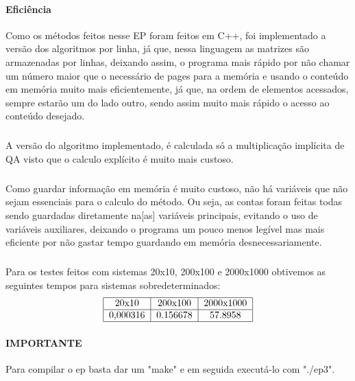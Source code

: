 \documentclass{article}
\begin{document}
	\paragraph{Eficiência}Como os métodos feitos nesse EP foram feitos em C++, foi implementado a versão dos algoritmos por linha, já que, nessa linguagem as matrizes são armazenadas por linhas, deixando assim, o programa mais rápido por não chamar um número maior que o necessário de pages para a memória e usando o conteúdo em memória muito mais eficientemente, já que, na ordem de elementos acessados, sempre estarão um do lado outro, sendo assim muito mais rápido o acesso ao conteúdo desejado.
	\subparagraph{}A versão do algoritmo implementado, é calculada só a multiplicação implícita de QA visto que o calculo explícito é muito mais custoso.
	\subparagraph{}Como guardar informação em memória é muito custoso, não há variáveis que não sejam essenciais para o calculo do método. Ou seja, as contas foram feitas todas sendo guardadas diretamente na[as] variáveis principais, evitando o uso de variáveis auxiliares, deixando o programa um pouco menos legível mas mais eficiente por não gastar tempo guardando em memória desnecessariamente.
	\subparagraph{}Para os testes feitos com sistemas 20x10, 200x100 e 2000x1000 obtivemos as seguintes tempos para sistemas sobredeterminados:
	$$\begin{tabular}{|c|c|c|}
		\hline
		20x10& 200x100 & 2000x1000 \\
		\hline
		0,000316 & 0.156678 & 57.8958 \\
		\hline
	\end{tabular}$$
	\paragraph{IMPORTANTE} Para compilar o ep basta dar um "make" e em seguida executá-lo com "./ep3".
\end{document}
